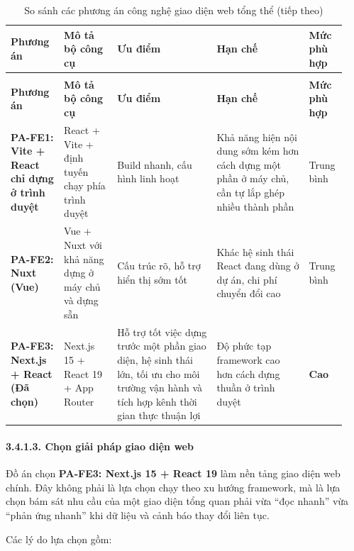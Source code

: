 \documentclass[a4paper]{extarticle}
\newcommand{\thesissettableid}[2]{%
  \renewcommand{\thetable}{#1}%
  \renewcommand{\theHtable}{#2}%
}
\begin{document}
{\thesissettableid{3.23A}{tab-ch3-so-sanh-cac-phuong-an-cong-nghe-frontend-tong-the}
\def\LTcaptype{table}
\begin{longtable}{|L{0.154\linewidth}|L{0.157\linewidth}|L{0.280\linewidth}|L{0.269\linewidth}|L{0.085\linewidth}|}
\caption{So sánh các phương án công nghệ giao diện web tổng thể}\label{tab:ch3-so-sanh-cac-phuong-an-cong-nghe-frontend-tong-the}\\
\hline \textbf{Phương án} & \textbf{Mô tả bộ công cụ} & \textbf{Ưu điểm} & \textbf{Hạn chế} & \textbf{Mức phù hợp} \\
\hline
\endfirsthead
\caption[]{So sánh các phương án công nghệ giao diện web tổng thể (tiếp theo)}\\
\hline \textbf{Phương án} & \textbf{Mô tả bộ công cụ} & \textbf{Ưu điểm} & \textbf{Hạn chế} & \textbf{Mức phù hợp} \\
\hline
\endhead
\hline
\endfoot
\endlastfoot
\textbf{PA-FE1: Vite + React chỉ dựng ở trình duyệt} & React + Vite +
định tuyến chạy phía trình duyệt & Build nhanh, cấu hình linh hoạt &
Khả năng hiện nội dung sớm kém hơn cách dựng một phần ở máy chủ, cần tự
lắp ghép nhiều thành phần & Trung bình \\\hline
\textbf{PA-FE2: Nuxt (Vue)} & Vue + Nuxt với khả năng dựng ở máy chủ và
dựng sẵn & Cấu trúc rõ, hỗ trợ hiển thị sớm tốt & Khác hệ sinh thái
React đang dùng ở dự án, chi phí chuyển đổi cao & Trung bình \\\hline
\textbf{PA-FE3: Next.js + React (Đã chọn)} & Next.js 15 + React 19 + App
Router & Hỗ trợ tốt việc dựng trước một phần giao diện, hệ sinh thái lớn,
tối ưu cho môi trường vận hành và tích hợp kênh thời gian thực thuận lợi
& Độ phức tạp framework cao hơn cách dựng thuần ở trình duyệt &
\textbf{Cao} \\\hline
\end{longtable}
}


\paragraph{3.4.1.3. Chọn giải pháp
giao diện web}\label{3143-chux1ecdn-giux1ea3i-phuxe1p-frontend}

Đồ án chọn \textbf{PA-FE3: Next.js 15 + React 19} làm nền tảng giao diện web
chính. Đây không phải là lựa chọn chạy theo xu hướng framework, mà là
lựa chọn bám sát nhu cầu của một giao diện tổng quan phải vừa ``đọc nhanh'' vừa
``phản ứng nhanh'' khi dữ liệu và cảnh báo thay đổi liên tục.

Các lý do lựa chọn gồm:
\end{document}
